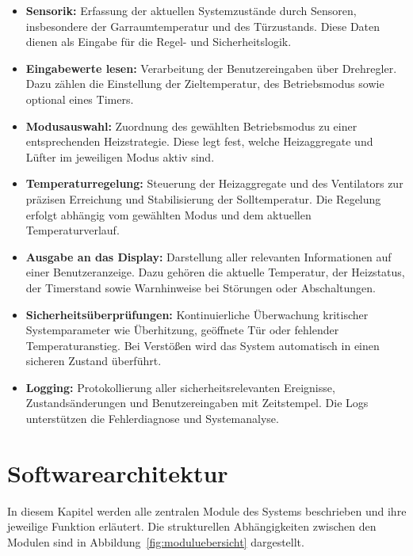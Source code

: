 \documentclass[a4paper,12pt]{article}
\begin{document}
\begin{itemize}
    \item \textbf{Sensorik:}  
    Erfassung der aktuellen Systemzustände durch Sensoren, insbesondere der Garraumtemperatur und des Türzustands. Diese Daten dienen als Eingabe für die Regel- und Sicherheitslogik.

    \item \textbf{Eingabewerte lesen:}  
    Verarbeitung der Benutzereingaben über Drehregler. Dazu zählen die Einstellung der Zieltemperatur, des Betriebsmodus sowie optional eines Timers.

    \item \textbf{Modusauswahl:}  
    Zuordnung des gewählten Betriebsmodus zu einer entsprechenden Heizstrategie. Diese legt fest, welche Heizaggregate und Lüfter im jeweiligen Modus aktiv sind.

    \item \textbf{Temperaturregelung:}  
    Steuerung der Heizaggregate und des Ventilators zur präzisen Erreichung und Stabilisierung der Solltemperatur. Die Regelung erfolgt abhängig vom gewählten Modus und dem aktuellen Temperaturverlauf.

    \item \textbf{Ausgabe an das Display:}  
    Darstellung aller relevanten Informationen auf einer Benutzeranzeige. Dazu gehören die aktuelle Temperatur, der Heizstatus, der Timerstand sowie Warnhinweise bei Störungen oder Abschaltungen.

    \item \textbf{Sicherheitsüberprüfungen:}  
    Kontinuierliche Überwachung kritischer Systemparameter wie Überhitzung, geöffnete Tür oder fehlender Temperaturanstieg. Bei Verstößen wird das System automatisch in einen sicheren Zustand überführt.

    \item \textbf{Logging:}  
    Protokollierung aller sicherheitsrelevanten Ereignisse, Zustandsänderungen und Benutzereingaben mit Zeitstempel. Die Logs unterstützen die Fehlerdiagnose und Systemanalyse.
\end{itemize}

\newpage

\section{Softwarearchitektur}

In diesem Kapitel werden alle zentralen Module des Systems beschrieben und ihre jeweilige Funktion erläutert. Die strukturellen Abhängigkeiten zwischen den Modulen sind in Abbildung~\ref{fig:moduluebersicht} dargestellt.
\end{document}
